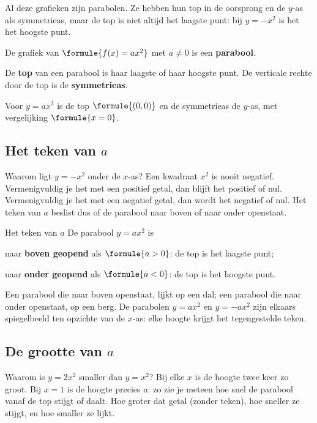 Al deze grafieken zijn parabolen. Ze hebben hun top in de oorsprong en de $y$-as als symmetrieas, maar de top is niet altijd het laagste punt: bij $y = -x^2$ is het het hoogste punt.

\begin{theorie}
De grafiek van $\formule{f(x) = ax^2}$ met $a \neq 0$ is een \textbf{\textcolor{accent}{parabool}}.

De \textbf{\textcolor{accent}{top}} van een parabool is haar laagste of haar hoogste punt. De verticale rechte door de top is de \textbf{\textcolor{accent}{symmetrieas}}.

Voor $y = ax^2$ is de top $\formule{(0, 0)}$ en de symmetrieas de $y$-as, met vergelijking $\formule{x = 0}$.
\end{theorie}

\subsection{Het teken van \texorpdfstring{$a$}{a}}

Waarom ligt $y = -x^2$ onder de $x$-as? Een kwadraat $x^2$ is nooit negatief. Vermenigvuldig je het met een positief getal, dan blijft het positief of nul. Vermenigvuldig je het met een negatief getal, dan wordt het negatief of nul. Het teken van $a$ beslist dus of de parabool naar boven of naar onder openstaat.

\begin{theorie}
\begin{stelling}{Het teken van $a$}
De parabool $y = ax^2$ is

\qquad naar \textbf{\textcolor{accent}{boven geopend}} als $\formule{a > 0}$: de top is het laagste punt;

\qquad naar \textbf{\textcolor{accent}{onder geopend}} als $\formule{a < 0}$: de top is het hoogste punt.
\end{stelling}
\end{theorie}

Een parabool die naar boven openstaat, lijkt op een dal; een parabool die naar onder openstaat, op een berg. De parabolen $y = ax^2$ en $y = -ax^2$ zijn elkaars spiegelbeeld ten opzichte van de $x$-as: elke hoogte krijgt het tegengestelde teken.

\subsection{De grootte van \texorpdfstring{$a$}{a}}

Waarom is $y = 2x^2$ smaller dan $y = x^2$? Bij elke $x$ is de hoogte twee keer zo groot. Bij $x = 1$ is de hoogte precies $a$: zo zie je meteen hoe snel de parabool vanaf de top stijgt of daalt. Hoe groter dat getal (zonder teken), hoe sneller ze stijgt, en hoe smaller ze lijkt.

